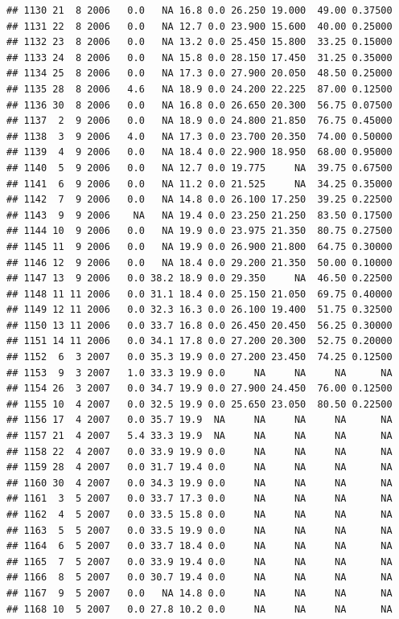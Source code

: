 \documentclass[
]{book}
\begin{document}
\begin{verbatim}
## 1130 21  8 2006   0.0   NA 16.8 0.0 26.250 19.000  49.00 0.37500
## 1131 22  8 2006   0.0   NA 12.7 0.0 23.900 15.600  40.00 0.25000
## 1132 23  8 2006   0.0   NA 13.2 0.0 25.450 15.800  33.25 0.15000
## 1133 24  8 2006   0.0   NA 15.8 0.0 28.150 17.450  31.25 0.35000
## 1134 25  8 2006   0.0   NA 17.3 0.0 27.900 20.050  48.50 0.25000
## 1135 28  8 2006   4.6   NA 18.9 0.0 24.200 22.225  87.00 0.12500
## 1136 30  8 2006   0.0   NA 16.8 0.0 26.650 20.300  56.75 0.07500
## 1137  2  9 2006   0.0   NA 18.9 0.0 24.800 21.850  76.75 0.45000
## 1138  3  9 2006   4.0   NA 17.3 0.0 23.700 20.350  74.00 0.50000
## 1139  4  9 2006   0.0   NA 18.4 0.0 22.900 18.950  68.00 0.95000
## 1140  5  9 2006   0.0   NA 12.7 0.0 19.775     NA  39.75 0.67500
## 1141  6  9 2006   0.0   NA 11.2 0.0 21.525     NA  34.25 0.35000
## 1142  7  9 2006   0.0   NA 14.8 0.0 26.100 17.250  39.25 0.22500
## 1143  9  9 2006    NA   NA 19.4 0.0 23.250 21.250  83.50 0.17500
## 1144 10  9 2006   0.0   NA 19.9 0.0 23.975 21.350  80.75 0.27500
## 1145 11  9 2006   0.0   NA 19.9 0.0 26.900 21.800  64.75 0.30000
## 1146 12  9 2006   0.0   NA 18.4 0.0 29.200 21.350  50.00 0.10000
## 1147 13  9 2006   0.0 38.2 18.9 0.0 29.350     NA  46.50 0.22500
## 1148 11 11 2006   0.0 31.1 18.4 0.0 25.150 21.050  69.75 0.40000
## 1149 12 11 2006   0.0 32.3 16.3 0.0 26.100 19.400  51.75 0.32500
## 1150 13 11 2006   0.0 33.7 16.8 0.0 26.450 20.450  56.25 0.30000
## 1151 14 11 2006   0.0 34.1 17.8 0.0 27.200 20.300  52.75 0.20000
## 1152  6  3 2007   0.0 35.3 19.9 0.0 27.200 23.450  74.25 0.12500
## 1153  9  3 2007   1.0 33.3 19.9 0.0     NA     NA     NA      NA
## 1154 26  3 2007   0.0 34.7 19.9 0.0 27.900 24.450  76.00 0.12500
## 1155 10  4 2007   0.0 32.5 19.9 0.0 25.650 23.050  80.50 0.22500
## 1156 17  4 2007   0.0 35.7 19.9  NA     NA     NA     NA      NA
## 1157 21  4 2007   5.4 33.3 19.9  NA     NA     NA     NA      NA
## 1158 22  4 2007   0.0 33.9 19.9 0.0     NA     NA     NA      NA
## 1159 28  4 2007   0.0 31.7 19.4 0.0     NA     NA     NA      NA
## 1160 30  4 2007   0.0 34.3 19.9 0.0     NA     NA     NA      NA
## 1161  3  5 2007   0.0 33.7 17.3 0.0     NA     NA     NA      NA
## 1162  4  5 2007   0.0 33.5 15.8 0.0     NA     NA     NA      NA
## 1163  5  5 2007   0.0 33.5 19.9 0.0     NA     NA     NA      NA
## 1164  6  5 2007   0.0 33.7 18.4 0.0     NA     NA     NA      NA
## 1165  7  5 2007   0.0 33.9 19.4 0.0     NA     NA     NA      NA
## 1166  8  5 2007   0.0 30.7 19.4 0.0     NA     NA     NA      NA
## 1167  9  5 2007   0.0   NA 14.8 0.0     NA     NA     NA      NA
## 1168 10  5 2007   0.0 27.8 10.2 0.0     NA     NA     NA      NA

\end{verbatim}
\end{document}
